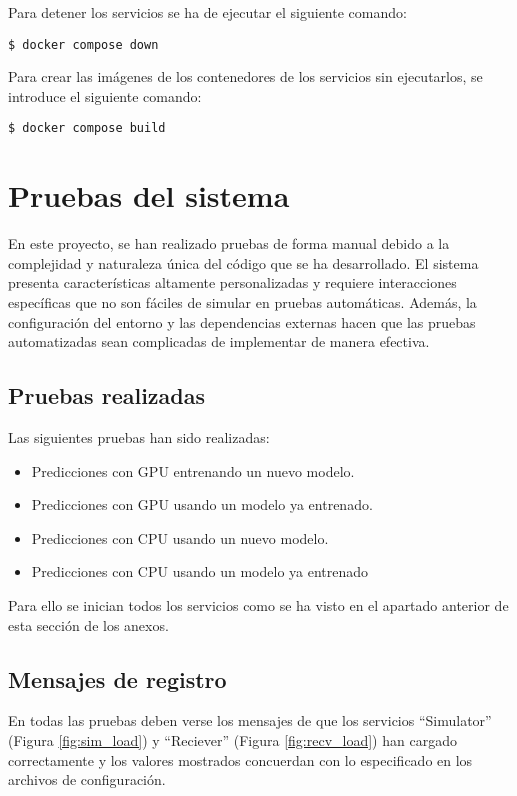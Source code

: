 Para detener los servicios se ha de ejecutar el siguiente comando:
\begin{lstlisting}
$ docker compose down
\end{lstlisting}

Para crear las imágenes de los contenedores de los servicios sin ejecutarlos, se introduce el siguiente comando:
\begin{lstlisting}
$ docker compose build
\end{lstlisting}

\section{Pruebas del sistema}

En este proyecto, se han realizado pruebas de forma manual debido a la complejidad y naturaleza única 
del código que se ha desarrollado. El sistema presenta características altamente personalizadas y requiere 
interacciones específicas que no son fáciles de simular en pruebas automáticas. Además, la configuración 
del entorno y las dependencias externas hacen que las pruebas automatizadas sean complicadas de implementar 
de manera efectiva.

\subsection{Pruebas realizadas}

Las siguientes pruebas han sido realizadas:
\begin{itemize}
    \item Predicciones con GPU entrenando un nuevo modelo.
    \item Predicciones con GPU usando un modelo ya entrenado.
    \item Predicciones con CPU usando un nuevo modelo.
    \item Predicciones con CPU usando un modelo ya entrenado
\end{itemize}

Para ello se inician todos los servicios como se ha visto en el apartado anterior de esta sección de los anexos.

\subsection{Mensajes de registro}

En todas las pruebas deben verse los mensajes de que los servicios ``Simulator'' (Figura \ref{fig:sim_load}) y ``Reciever'' (Figura \ref{fig:recv_load}) han cargado correctamente
y los valores mostrados concuerdan con lo especificado en los archivos de configuración.

